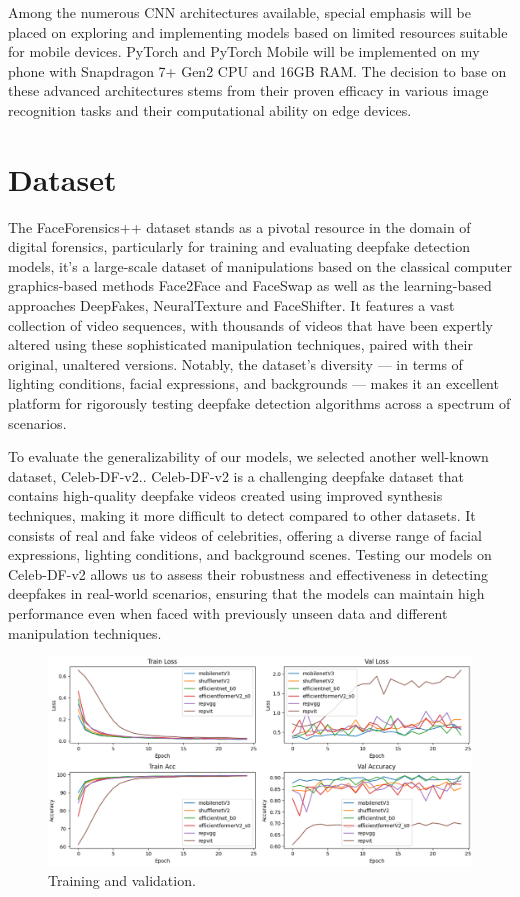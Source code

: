 \documentclass[10pt,twocolumn,letterpaper]{article}
\begin{document}
Among the numerous CNN architectures available, special emphasis will be placed on exploring and implementing models based on limited resources suitable for mobile devices. PyTorch\cite{paszke2019pytorch} and PyTorch Mobile will be implemented on my phone with Snapdragon 7+ Gen2 CPU and 16GB RAM. The decision to base on these advanced architectures stems from their proven efficacy in various image recognition tasks and their computational ability on edge devices.



\section{Dataset}
The FaceForensics++\cite{Rossler_2019_ICCV} dataset stands as a pivotal resource in the domain of digital forensics, particularly for training and evaluating deepfake detection models, it's a large-scale dataset of manipulations based on the classical computer graphics-based methods
Face2Face\cite{Thies_2016_CVPR} and FaceSwap as well as the learning-based approaches DeepFakes, NeuralTexture\cite{10.1145/3306346.3323035} and FaceShifter\cite{li2020faceshifter}. It features a vast collection of video sequences, with thousands of videos that have been expertly altered using these sophisticated manipulation techniques, paired with their original, unaltered versions. Notably, the dataset's diversity — in terms of lighting conditions, facial expressions, and backgrounds — makes it an excellent platform for rigorously testing deepfake detection algorithms across a spectrum of scenarios.

To evaluate the generalizability of our models, we selected another well-known dataset, Celeb-DF-v2.\cite{li2020celebdf}. Celeb-DF-v2\cite{li2020celebdf} is a challenging deepfake dataset that contains high-quality deepfake videos created using improved synthesis techniques, making it more difficult to detect compared to other datasets. It consists of real and fake videos of celebrities, offering a diverse range of facial expressions, lighting conditions, and background scenes. Testing our models on Celeb-DF-v2\cite{li2020celebdf} allows us to assess their robustness and effectiveness in detecting deepfakes in real-world scenarios, ensuring that the models can maintain high performance even when faced with previously unseen data and different manipulation techniques.

\begin{figure}
  \centering
   \includegraphics[width=0.8\linewidth]{figure/lossandacc.png}
   \caption{Training and validation.}
   \label{fig:f1}
\end{figure}
\end{document}
